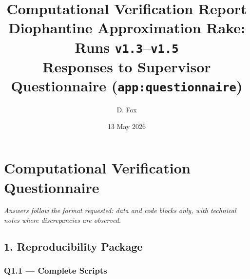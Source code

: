 \documentclass[11pt,a4paper]{article}
\title{\textbf{Computational Verification Report}\\
  \large Diophantine Approximation Rake: Runs \texttt{v1.3}--\texttt{v1.5}\\
  \normalsize Responses to Supervisor Questionnaire (\texttt{app:questionnaire})}
\author{D. Fox}
\date{13 May 2026}
\begin{document}
\maketitle
\tableofcontents
\clearpage

\appendix
\section{Computational Verification Questionnaire}
\label{app:questionnaire}

\emph{Answers follow the format requested: data and code blocks only, with
  technical notes where discrepancies are observed.}

\subsection{1. Reproducibility Package}

\subsubsection*{Q1.1 --- Complete Scripts}
\end{document}
